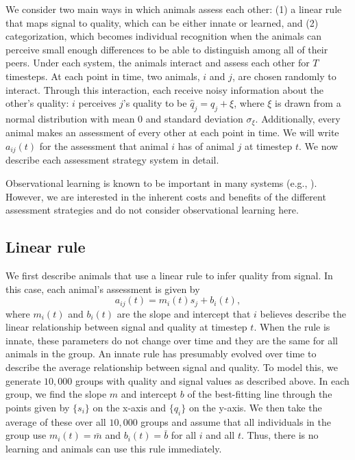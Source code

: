 We consider two main ways in which animals assess each other: (1) a linear rule that maps signal to quality, which can be either innate or learned, and (2) categorization, which becomes individual recognition when the animals can perceive small enough differences to be able to distinguish among all of their peers. Under each system, the animals interact and assess each other for $T$ timesteps. At each point in time, two animals, $i$ and $j$, are chosen randomly to interact. Through this interaction, each receive noisy information about the other's quality: $i$ perceives $j$'s quality to be $\hat{q}_j=q_j+\xi$, where $\xi$ is drawn from a normal distribution with mean $0$ and standard deviation $\sigma_\xi$.  Additionally, every animal makes an assessment of every other at each point in time. We will write $a_{ij}(t)$ for the assessment that animal $i$ has of animal $j$ at timestep $t$. We now describe each assessment strategy system in detail.

Observational learning is known to be important in many systems (e.g., \citep{Freeman:1985kl,Holekamp:1991nx,Schaik:2011oq,Hobson:2015uq,Seyfarth2015SocialCognition}). However, we are interested in the inherent costs and benefits of the different assessment strategies and do not consider observational learning here. 


\subsection*{Linear rule}
We first describe animals that use a linear rule to infer quality from signal. In this case, each animal's assessment is given by
\begin{equation*}
a_{ij}(t)=m_i(t)s_j+b_i(t),
\end{equation*}
where $m_i(t)$ and $b_i(t)$ are the slope and intercept that $i$ believes describe the linear relationship between signal and quality at timestep $t$. When the rule is innate, these parameters do not change over time and they are the same for all animals in the group. An innate rule has presumably evolved over time to describe the average relationship between signal and quality. To model this, we generate $10,000$ groups with quality and signal values as described above. In each group, we find the slope $m$ and intercept $b$ of the best-fitting line through the points given by $\{s_i\}$ on the x-axis and $\{q_i\}$ on the y-axis. We then take the average of these over all $10,000$ groups and assume that all individuals in the group use $m_i(t)=\bar{m}$ and $b_i(t)=\bar{b}$ for all $i$ and all $t$. Thus, there is no learning and animals can use this rule immediately. 

